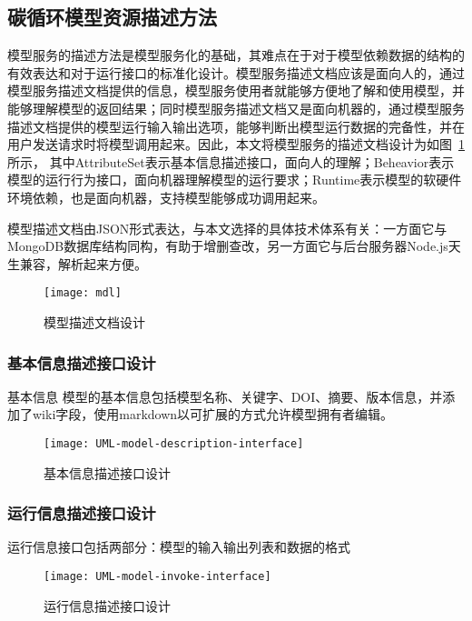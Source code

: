 

\subsection{碳循环模型资源描述方法}
模型服务的描述方法是模型服务化的基础，其难点在于对于模型依赖数据的结构的有效表达和对于运行接口的标准化设计。模型服务描述文档应该是面向人的，通过模型服务描述文档提供的信息，模型服务使用者就能够方便地了解和使用模型，并能够理解模型的返回结果；同时模型服务描述文档又是面向机器的，通过模型服务描述文档提供的模型运行输入输出选项，能够判断出模型运行数据的完备性，并在用户发送请求时将模型调用起来。因此，本文将模型服务的描述文档设计为如图~\ref{fig:mdl}所示，
其中AttributeSet表示基本信息描述接口，面向人的理解；Beheavior表示模型的运行行为接口，面向机器理解模型的运行要求；Runtime表示模型的软硬件环境依赖，也是面向机器，支持模型能够成功调用起来。

模型描述文档由JSON形式表达，与本文选择的具体技术体系有关：一方面它与MongoDB数据库结构同构，有助于增删查改，另一方面它与后台服务器Node.js天生兼容，解析起来方便。

\begin{figure}[!htbp]
    \centering
    \texttt{[image: mdl]}
    \caption{模型描述文档设计}
    \label{fig:mdl}
\end{figure}

\subsubsection{基本信息描述接口设计}
基本信息
模型的基本信息包括模型名称、关键字、DOI、摘要、版本信息，并添加了wiki字段，使用markdown以可扩展的方式允许模型拥有者编辑。

\begin{figure}[!htbp]
    \centering
    \texttt{[image: UML-model-description-interface]}
    \caption{基本信息描述接口设计}
    \label{fig:UML-model-description-interface}
\end{figure}

\subsubsection{运行信息描述接口设计}
运行信息接口包括两部分：模型的输入输出列表和数据的格式

\begin{figure}[!htbp]
    \centering
    \texttt{[image: UML-model-invoke-interface]}
    \caption{运行信息描述接口设计}
    \label{fig:UML-model-invoke-interface}
\end{figure}

